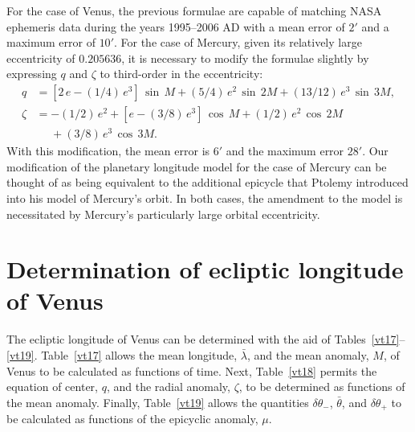 For the case of Venus, the previous formulae are capable of matching NASA ephemeris data during the years 1995--2006 AD
with a mean error of $2'$ and a maximum error of $10'$. For the case of Mercury, given its relatively large eccentricity of
$0.205636$, it is necessary to modify the formulae slightly by expressing $q$ and $\zeta$ to
third-order in the eccentricity:
\begin{align}
q &= [2\,e - (1/4)\,e^3]\,\sin \,M + (5/4) \,e^2\,\sin\,2M + (13/12)\,e^3\,\sin \,3M,\\[0.5ex]
\zeta &= -(1/2)\,e^2+ [e-(3/8)\,e^3]\,\cos\,M + (1/2)\,e^2\,\cos\,2M \nonumber\\[0.5ex]
&\phantom{=}+ (3/8)\,e^3\,\cos\,3M.
\end{align}
With this modification, the mean error is $6'$ and the maximum error $28'$. Our modification of the planetary longitude model for the case of Mercury can be thought of
as being equivalent to the additional epicycle that Ptolemy introduced into his model of Mercury's orbit. In both cases, the amendment to the model is necessitated by
Mercury's particularly large orbital eccentricity. 

\section{Determination of ecliptic longitude of Venus}
The ecliptic longitude of Venus can be determined with the aid of Tables~\ref{vt17}--\ref{vt19}. Table~\ref{vt17} allows
the mean longitude, $\bar{\lambda}$, and the mean anomaly, $M$, of Venus to be calculated as functions of
time. Next, Table~\ref{vt18} permits the equation of center, $q$, and the radial anomaly, $\zeta$, to
be determined as functions of the mean anomaly. Finally, Table~\ref{vt19} allows the quantities
$\delta\theta_-$, $\bar{\theta}$, and $\delta\theta_+$ to be calculated as functions of the epicyclic
anomaly, $\mu$. 

